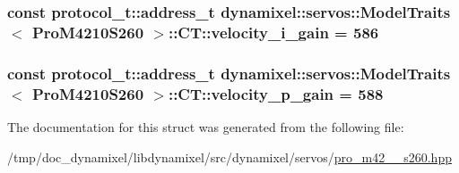 \subsubsection[{velocity\+\_\+i\+\_\+gain}]{\setlength{\rightskip}{0pt plus 5cm}const {\bf protocol\+\_\+t\+::address\+\_\+t} {\bf dynamixel\+::servos\+::\+Model\+Traits}$<$ {\bf Pro\+M4210\+S260} $>$\+::C\+T\+::velocity\+\_\+i\+\_\+gain = 586\hspace{0.3cm}{\ttfamily [static]}}\label{structdynamixel_1_1servos_1_1_model_traits_3_01_pro_m4210_s260_01_4_1_1_c_t_ac45c584e34c133dbb96fc1efa6c1f08a}
\hypertarget{structdynamixel_1_1servos_1_1_model_traits_3_01_pro_m4210_s260_01_4_1_1_c_t_a5215fcc5863f28fafa01d7b6e8b692eb}{}
\subsubsection[{velocity\+\_\+p\+\_\+gain}]{\setlength{\rightskip}{0pt plus 5cm}const {\bf protocol\+\_\+t\+::address\+\_\+t} {\bf dynamixel\+::servos\+::\+Model\+Traits}$<$ {\bf Pro\+M4210\+S260} $>$\+::C\+T\+::velocity\+\_\+p\+\_\+gain = 588\hspace{0.3cm}{\ttfamily [static]}}\label{structdynamixel_1_1servos_1_1_model_traits_3_01_pro_m4210_s260_01_4_1_1_c_t_a5215fcc5863f28fafa01d7b6e8b692eb}


The documentation for this struct was generated from the following file\+:\begin{DoxyCompactItemize}
\item 
/tmp/doc\+\_\+dynamixel/libdynamixel/src/dynamixel/servos/\hyperlink{pro__m42__10__s260_8hpp}{pro\+\_\+m42\+\_\+\_\+s260.\+hpp}\end{DoxyCompactItemize}
